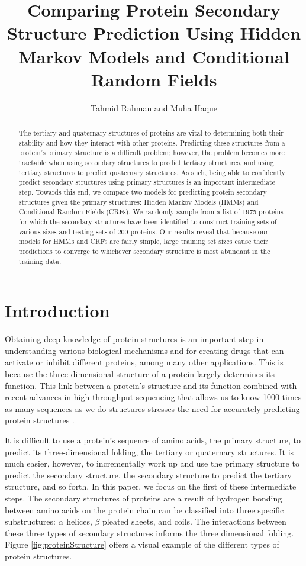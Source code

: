 \documentclass[11 pt, twocolumn]{article}
\title{Comparing Protein Secondary Structure Prediction Using Hidden Markov Models and Conditional Random Fields}
\author{Tahmid Rahman and Muha Haque}
\begin{document}
\maketitle

\begin{abstract}
The tertiary and quaternary structures of proteins are vital to determining both their stability and how they interact with other proteins. Predicting these structures from a protein's primary structure is a difficult problem; however, the problem becomes more tractable when using secondary structures to predict tertiary structures, and using tertiary structures to predict quaternary structures. As such, being able to confidently predict secondary structures using primary structures is an important intermediate step. Towards this end, we compare two models for predicting protein secondary structures given the primary structures: Hidden Markov Models (HMMs) and Conditional Random Fields (CRFs). We randomly sample from a list of 1975 proteins for which the secondary structures have been identified to construct training sets of various sizes and testing sets of 200 proteins. Our results reveal that because our models for HMMs and CRFs are fairly simple, large training set sizes cause their predictions to converge to whichever secondary structure is most abundant in the training data.  
\end{abstract}

\section{Introduction}

Obtaining deep knowledge of protein structures is an important step in understanding various biological mechanisms and for creating drugs that can activate or inhibit different proteins, among many other applications. This is because the three-dimensional structure of a protein largely determines its function. This link between a protein’s structure and its function combined with recent advances in high throughput sequencing that allows us to know 1000 times as many sequences as we do structures stresses the need for accurately predicting protein structures \cite{Dill}. 

It is difficult to use a protein's sequence of amino acids, the primary structure, to predict its three-dimensional folding, the tertiary or quaternary structures. It is much easier, however, to incrementally work up and use the primary structure to predict the secondary structure, the secondary structure to predict the tertiary structure, and so forth. In this paper, we focus on the first of these intermediate steps. The secondary structures of proteins are a result of hydrogen bonding between amino acids on the protein chain can be classified into three specific substructures: $\alpha$ helices, $\beta$ pleated sheets, and coils. The interactions between these three types of secondary structures informs the three dimensional folding. Figure \ref{fig:proteinStructure} offers a visual example of the different types of protein structures.
\end{document}
